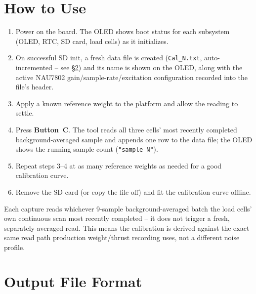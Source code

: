 \documentclass[11pt,letterpaper]{article}
\begin{document}
\section{How to Use}

\begin{enumerate}[nosep]
  \item Power on the board. The OLED shows boot status for each subsystem
        (OLED, RTC, SD card, load cells) as it initializes.
  \item On successful SD init, a fresh data file is created
        (\texttt{Cal\_N.txt}, auto-incremented -- see §\ref{sec:output}) and
        its name is shown on the OLED, along with the active NAU7802
        gain/sample-rate/excitation configuration recorded into the file's
        header.
  \item Apply a known reference weight to the platform and allow the
        reading to settle.
  \item Press \textbf{Button~C}. The tool reads all three cells' most
        recently completed background-averaged sample and appends one row
        to the data file; the OLED shows the running sample count
        (\texttt{"sample N"}).
  \item Repeat steps 3--4 at as many reference weights as needed for a
        good calibration curve.
  \item Remove the SD card (or copy the file off) and fit the calibration
        curve offline.
\end{enumerate}

\begin{notebox}
Each capture reads whichever 9-sample background-averaged batch the load
cells' own continuous scan most recently completed -- it does not trigger
a fresh, separately-averaged read. This means the calibration is derived
against the exact same read path production weight/thrust recording
uses, not a different noise profile.
\end{notebox}

\section{Output File Format}
\label{sec:output}
\end{document}
